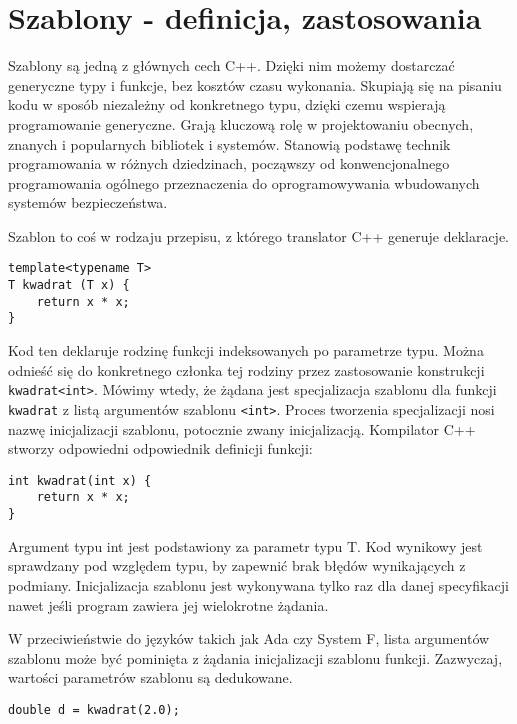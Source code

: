 \documentclass[11pt, a4paper]{article}
\begin{document}
\lstset{language=C++}

\section{Szablony - definicja, zastosowania}

Szablony są jedną z głównych cech C++. Dzięki nim możemy dostarczać generyczne typy i funkcje, 
bez kosztów czasu wykonania. Skupiają się na pisaniu kodu w sposób niezależny od konkretnego typu,
dzięki czemu wspierają programowanie generyczne. Grają kluczową rolę w projektowaniu obecnych, znanych
i popularnych bibliotek i systemów. Stanowią podstawę technik programowania w różnych dziedzinach, począwszy od konwencjonalnego programowania ogólnego przeznaczenia do oprogramowywania wbudowanych 
systemów bezpieczeństwa.

Szablon to coś w rodzaju przepisu, z którego translator C++ generuje deklaracje.

\begin{lstlisting}[frame=single]
template<typename T>
T kwadrat (T x) {
	return x * x;
}
\end{lstlisting}

Kod ten deklaruje rodzinę funkcji indeksowanych po parametrze typu. Można odnieść się do konkretnego członka tej rodziny przez zastosowanie konstrukcji \verb#kwadrat<int>#. Mówimy wtedy, że żądana jest specjalizacja szablonu dla funkcji \verb#kwadrat# z listą argumentów szablonu \verb#<int>#. Proces tworzenia specjalizacji nosi nazwę inicjalizacji szablonu, potocznie zwany inicjalizacją. Kompilator C++ stworzy odpowiedni odpowiednik definicji funkcji:

\begin{lstlisting}[frame=single]
int kwadrat(int x) {
	return x * x;
}
\end{lstlisting}

Argument typu int jest podstawiony za parametr typu T. Kod wynikowy jest sprawdzany pod względem typu, by zapewnić brak błędów wynikających z podmiany. Inicjalizacja szablonu jest wykonywana tylko raz dla danej specyfikacji nawet jeśli program zawiera jej wielokrotne żądania. 

W przeciwieństwie do języków takich jak Ada czy System F, lista argumentów szablonu może być pominięta z żądania inicjalizacji szablonu funkcji. Zazwyczaj, wartości parametrów szablonu są dedukowane.
\newline

\verb#double d = kwadrat(2.0);# \newline
\end{document}
